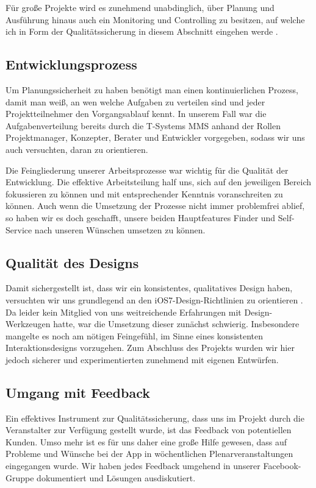 	Für große Projekte wird es zunehmend unabdinglich, über Planung und Ausführung hinaus auch ein Monitoring und Controlling zu besitzen, auf welche ich in Form der Qualitätssicherung in diesem Abschnitt eingehen werde \cite{Institute08}.

\subsection{Entwicklungsprozess}
	Um Planungssicherheit zu haben benötigt man einen kontinuierlichen Prozess, damit man weiß, an wen welche Aufgaben zu verteilen sind und jeder Projektteilnehmer den Vorgangsablauf kennt. In unserem Fall war die Aufgabenverteilung bereits durch die T-Systems MMS anhand der Rollen Projektmanager, Konzepter, Berater und Entwickler vorgegeben, sodass wir uns auch versuchten, daran zu orientieren. 
	
	Die Feingliederung unserer Arbeitsprozesse war wichtig für die Qualität der Entwicklung. Die effektive Arbeitsteilung half uns, sich auf den jeweiligen Bereich fokussieren zu können und mit entsprechender Kenntnis voranschreiten zu können. Auch wenn die Umsetzung der Prozesse nicht immer problemfrei ablief, so haben wir es doch geschafft, unsere beiden Hauptfeatures Finder und Self-Service nach unseren Wünschen umsetzen zu können.

\subsection{Qualität des Designs}
	Damit sichergestellt ist, dass wir ein konsistentes, qualitatives Design haben, versuchten wir uns grundlegend an den iOS7-Design-Richtlinien zu orientieren \cite{Apple14}. Da leider kein Mitglied von uns weitreichende Erfahrungen mit Design-Werkzeugen hatte, war die Umsetzung dieser zunächst schwierig. Insbesondere mangelte es noch am nötigen Feingefühl, im Sinne eines konsistenten Interaktionsdesigns vorzugehen. Zum Abschluss des Projekts wurden wir hier jedoch sicherer und experimentierten zunehmend mit eigenen Entwürfen.

\subsection{Umgang mit Feedback}
	Ein effektives Instrument zur Qualitätssicherung, dass uns im Projekt durch die Veranstalter zur Verfügung gestellt wurde, ist das Feedback von potentiellen Kunden. Umso mehr ist es für uns daher eine große Hilfe gewesen, dass auf Probleme und Wünsche bei der App in wöchentlichen Plenarveranstaltungen eingegangen wurde. Wir haben jedes Feedback umgehend in unserer Facebook-Gruppe dokumentiert und Lösungen ausdiskutiert.
	
